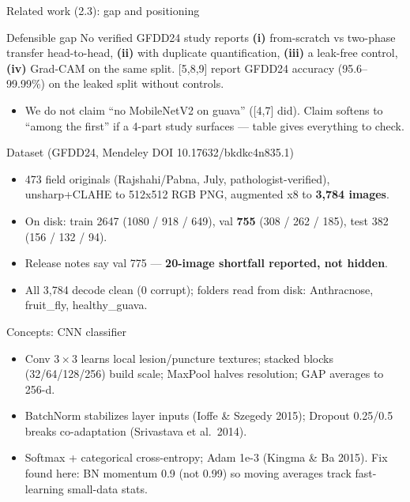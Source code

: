\documentclass[aspectratio=169]{beamer}
\begin{document}
\begin{frame}{Related work (2.3): gap and positioning}
  \begin{block}{Defensible gap}
    No verified GFDD24 study reports \textbf{(i)} from-scratch vs two-phase transfer head-to-head, \textbf{(ii)} with duplicate quantification, \textbf{(iii)} a leak-free control, \textbf{(iv)} Grad-CAM on the same split. [5,8,9] report GFDD24 accuracy (95.6--99.99\%) on the leaked split without controls.
  \end{block}
  \begin{itemize}
    \item We do not claim ``no MobileNetV2 on guava'' ([4,7] did). Claim softens to ``among the first'' if a 4-part study surfaces --- table gives everything to check.
  \end{itemize}
\end{frame}
\begin{frame}{Dataset (GFDD24, Mendeley DOI 10.17632/bkdkc4n835.1)}
  \begin{itemize}
    \item 473 field originals (Rajshahi/Pabna, July, pathologist-verified), unsharp+CLAHE to 512x512 RGB PNG, augmented x8 to \textbf{3,784 images}.
    \item On disk: train 2647 (1080 / 918 / 649), val \textbf{755} (308 / 262 / 185), test 382 (156 / 132 / 94).
    \item Release notes say val 775 --- \textbf{20-image shortfall reported, not hidden}.
    \item All 3,784 decode clean (0 corrupt); folders read from disk: Anthracnose, fruit\_fly, healthy\_guava.
  \end{itemize}
\end{frame}
\begin{frame}{Concepts: CNN classifier}
  \begin{itemize}
    \item Conv $3\times3$ learns local lesion/puncture textures; stacked blocks (32/64/128/256) build scale; MaxPool halves resolution; GAP averages to 256-d.
    \item BatchNorm stabilizes layer inputs (Ioffe \& Szegedy 2015); Dropout 0.25/0.5 breaks co-adaptation (Srivastava et al.\ 2014).
    \item Softmax + categorical cross-entropy; Adam 1e-3 (Kingma \& Ba 2015). Fix found here: BN momentum 0.9 (not 0.99) so moving averages track fast-learning small-data stats.
  \end{itemize}
\end{frame}
\end{document}
